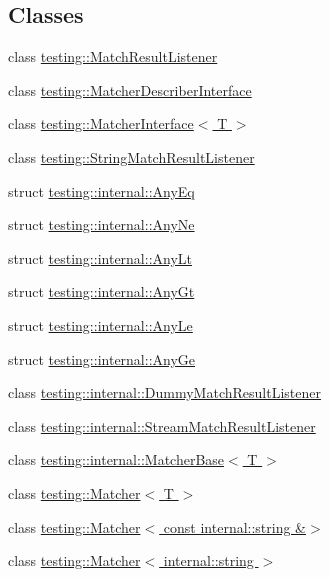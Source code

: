 \subsection*{Classes}
\begin{DoxyCompactItemize}
\item 
class \hyperlink{classtesting_1_1_match_result_listener}{testing\+::\+Match\+Result\+Listener}
\item 
class \hyperlink{classtesting_1_1_matcher_describer_interface}{testing\+::\+Matcher\+Describer\+Interface}
\item 
class \hyperlink{classtesting_1_1_matcher_interface}{testing\+::\+Matcher\+Interface$<$ T $>$}
\item 
class \hyperlink{classtesting_1_1_string_match_result_listener}{testing\+::\+String\+Match\+Result\+Listener}
\item 
struct \hyperlink{structtesting_1_1internal_1_1_any_eq}{testing\+::internal\+::\+Any\+Eq}
\item 
struct \hyperlink{structtesting_1_1internal_1_1_any_ne}{testing\+::internal\+::\+Any\+Ne}
\item 
struct \hyperlink{structtesting_1_1internal_1_1_any_lt}{testing\+::internal\+::\+Any\+Lt}
\item 
struct \hyperlink{structtesting_1_1internal_1_1_any_gt}{testing\+::internal\+::\+Any\+Gt}
\item 
struct \hyperlink{structtesting_1_1internal_1_1_any_le}{testing\+::internal\+::\+Any\+Le}
\item 
struct \hyperlink{structtesting_1_1internal_1_1_any_ge}{testing\+::internal\+::\+Any\+Ge}
\item 
class \hyperlink{classtesting_1_1internal_1_1_dummy_match_result_listener}{testing\+::internal\+::\+Dummy\+Match\+Result\+Listener}
\item 
class \hyperlink{classtesting_1_1internal_1_1_stream_match_result_listener}{testing\+::internal\+::\+Stream\+Match\+Result\+Listener}
\item 
class \hyperlink{classtesting_1_1internal_1_1_matcher_base}{testing\+::internal\+::\+Matcher\+Base$<$ T $>$}
\item 
class \hyperlink{classtesting_1_1_matcher}{testing\+::\+Matcher$<$ T $>$}
\item 
class \hyperlink{classtesting_1_1_matcher_3_01const_01internal_1_1string_01_6_4}{testing\+::\+Matcher$<$ const internal\+::string \&$>$}
\item 
class \hyperlink{classtesting_1_1_matcher_3_01internal_1_1string_01_4}{testing\+::\+Matcher$<$ internal\+::string $>$}

\end{DoxyCompactItemize}
